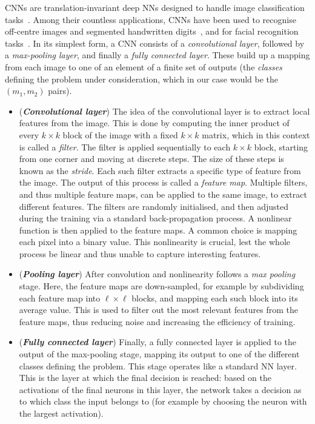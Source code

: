 \acp{CNN} are translation-invariant deep NNs designed to handle image classification tasks~\cite{lecun2015deep}. Among their countless applications, CNNs have been used to recognise off-centre images and segmented handwritten digits~\cite{simard2003best,ciresan2011flexible},
and for facial recognition tasks~\cite{matsugu2003subject}.
In its simplest form, a \ac{CNN} consists of a \emph{convolutional layer},
followed by a \emph{max-pooling layer}, and finally a \emph{fully connected layer}.
These build up a mapping from each image to one of an element of a finite set of outputs (the \emph{classes} defining the problem under consideration, which in our case would be the $(m_1,m_2)$ pairs).
\begin{itemize}
	\item (\textbf{\emph{Convolutional layer}})
		The idea of the convolutional layer is to extract local features from the image.
		This is done by computing the inner product of every $k\times k$ block of the image with a fixed $k\times k$ matrix, which in this context is called a \emph{filter}. The filter is applied sequentially to each $k\times k$ block, starting from one corner and moving at discrete steps. The size of these steps is known as the \emph{stride}.
		Each such filter extracts a specific type of feature from the image. The output of this process is called a \emph{feature map}. Multiple filters, and thus multiple feature maps, can be applied to the same image, to extract different features.
		The filters are randomly initialised, and then adjusted during the training via a standard back-propagation process.
		A nonlinear function is then applied to the feature maps. A common choice is mapping each pixel into a binary value. This nonlinearity is crucial, lest the whole process be linear and thus unable to capture interesting features.
	\item (\textbf{\emph{Pooling layer}})
		After convolution and nonlinearity follows a \emph{max pooling} stage. Here, the feature maps are down-sampled, for example by subdividing each feature map into $\ell\times \ell$ blocks, and mapping each such block into its average value.
		This is used to filter out the most relevant features from the feature maps, thus reducing noise and increasing the efficiency of training.
	\item (\textbf{\emph{Fully connected layer}})
		Finally, a fully connected layer is applied to the output of the max-pooling stage, mapping its output to one of the different classes defining the problem.
		This stage operates like a standard NN layer.
		This is the layer at which the final decision is reached: based on the activations of the final neurons in this layer, the network takes a decision as to which class the input belongs to (for example by choosing the neuron with the largest activation).
\end{itemize}
